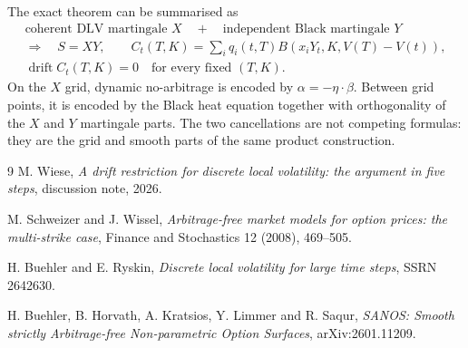 \documentclass[11pt,a4paper]{article}
\begin{document}
The exact theorem can be summarised as
\begin{equation}
 \boxed{
 \begin{gathered}
 \text{coherent DLV martingale }X
 \quad+\quad
 \text{independent Black martingale }Y\\
 \Longrightarrow\quad
 S=XY,\qquad
 C_t(T,K)=\sum_iq_i(t,T)B(x_iY_t,K,V(T)-V(t)),\\
 \operatorname{drift}C_t(T,K)=0
 \quad\text{for every fixed }(T,K).
 \end{gathered}}
\end{equation}
On the $X$ grid, dynamic no-arbitrage is encoded by
$\alpha=-\eta\cdot\beta$.  Between grid points, it is encoded by the Black heat
equation together with orthogonality of the $X$ and $Y$ martingale parts.  The
two cancellations are not competing formulas: they are the grid and smooth
parts of the same product construction.

\begin{thebibliography}{9}
M. Wiese,
\emph{A drift restriction for discrete local volatility: the argument in five
steps}, discussion note, 2026.

M. Schweizer and J. Wissel,
\emph{Arbitrage-free market models for option prices: the multi-strike case},
Finance and Stochastics 12 (2008), 469--505.

H. Buehler and E. Ryskin,
\emph{Discrete local volatility for large time steps}, SSRN 2642630.

H. Buehler, B. Horvath, A. Kratsios, Y. Limmer and R. Saqur,
\emph{SANOS: Smooth strictly Arbitrage-free Non-parametric Option Surfaces},
arXiv:2601.11209.
\end{thebibliography}
\end{document}

